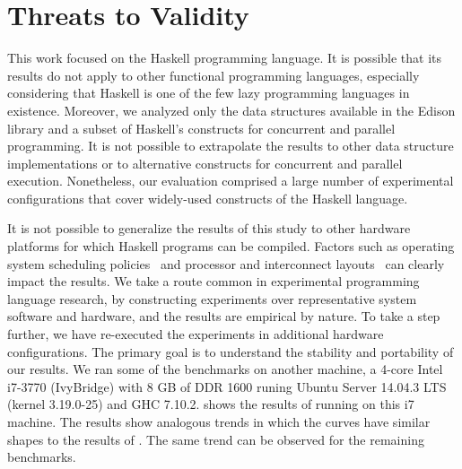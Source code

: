 \section{Threats to Validity}\label{sec:threats}
This work focused on the Haskell programming language. It is possible that its results do not apply to other functional programming languages, especially considering that Haskell is one of the few lazy programming languages in existence. Moreover, we analyzed only the data structures available in the Edison library and a subset of Haskell's constructs for concurrent and parallel programming. It is not possible to extrapolate the results to other data structure implementations or to alternative constructs for concurrent and parallel execution. Nonetheless, our evaluation comprised a large number of experimental configurations that cover widely-used constructs of the Haskell language.

It is not possible to generalize the results of this study to other hardware platforms for which Haskell programs can be compiled. Factors such as operating system scheduling policies~\citep{yuan:2003} and processor and interconnect layouts~\citep{solernou:2013:ETA} can clearly impact the results. We take a route common in experimental programming language research, by constructing experiments over representative system software and hardware, and the results are empirical by nature. To take a step further, we have re-executed the experiments in additional hardware configurations. The primary goal is to understand the stability and portability of our results. We ran some of the benchmarks on another machine, a 4-core Intel i7-3770 (IvyBridge) with 8 GB of DDR 1600 runing Ubuntu Server 14.04.3 LTS (kernel 3.19.0-25) and GHC 7.10.2.  shows the results of \mandelbrot running on this i7 machine. The results show analogous trends in which the curves have similar shapes to the results of . The same trend can be observed for the remaining benchmarks.

